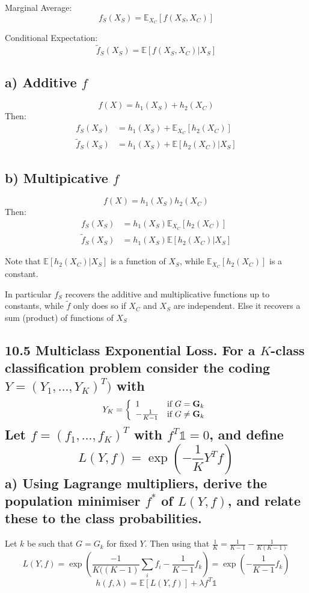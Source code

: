 Marginal Average:
$$ f_{S}(X_S) = \mathbb{E}_{X_C} \left[ f(X_S, X_C) \right]$$

Conditional Expectation:
$$ \tilde{f}_{S}(X_S) = \mathbb{E} \left[ f(X_S, X_C) \vert X_S \right]$$

\subsection*{a) Additive $f$}
$$f(X) = h_1(X_S) + h_2(X_C)$$
Then:
\begin{align*}
    f_{S}(X_S) &=  h_1(X_S) + \mathbb{E}_{X_C} \left[  h_2(X_C) \right] \\
     \tilde{f}_{S}(X_S) &=  h_1(X_S) + \mathbb{E}\left[ h_2(X_C) \vert X_S \right]
\end{align*}

\subsection*{b) Multipicative $f$}
$$f(X) = h_1(X_S) h_2(X_C)$$
Then:
\begin{align*}
    f_{S}(X_S) &= h_1(X_S) \mathbb{E}_{X_C} \left[  h_2(X_C) \right] \\
     \tilde{f}_{S}(X_S) &= h_1(X_S) \mathbb{E}\left[ h_2(X_C) \vert X_S \right]
\end{align*}

Note that $\mathbb{E}\left[ h_2(X_C) \vert X_S \right]$ is a function of $X_S$, while 
$\mathbb{E}_{X_C} \left[  h_2(X_C) \right] $ is a constant.

In particular $f_S$ recovers the additive and multiplicative functions up to constants, while $\tilde{f}$ only does so if $X_C$ and $X_S$ are independent. Else it recovers a sum (product) of functions of $X_S$


\subsection*{10.5 Multiclass Exponential Loss. For a $K$-class classification problem consider the coding $Y = (Y_1, \dots, Y_K)^T)$ with 
$$Y_K = \left\{ \begin{array}{ll} 1 & \mbox{if } G = \mathbf{G}_k \\ -\frac{1}{K-1} & \mbox{if } G \neq \mathbf{G}_k \end{array} \right.$$
Let $f = (f_1, \dots, f_K)^T$ with $f^T \mathbb{1} = 0$, and define
$$ L(Y, f) = \exp \left(-\frac{1}{K}Y^T f\right)$$
a) Using Lagrange multipliers, derive the population minimiser $f^*$ of $L(Y, f)$, and relate these to the class probabilities.
}

Let $k$ be such that $G = G_k$ for fixed $Y$. Then using that $\frac{1}{K} = \frac{1}{K-1} - \frac{1}{K\left(K-1\right)}$
$$ L(Y, f) = \exp\left(\frac{-1}{K(\left(K-1\right)} \sum_i f_i -\frac{1}{K-1} f_k\right) = \exp\left(-\frac{1}{K-1} f_k\right) $$
$$ h(f, \lambda) = \mathbb{E}\left[L(Y, f)\right] + \lambda f^T \mathbb{1}$$

